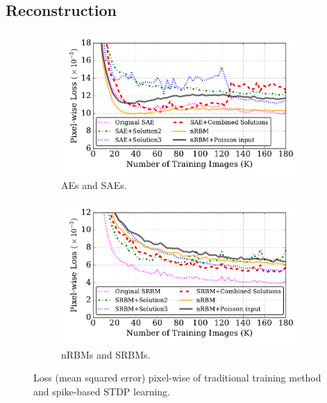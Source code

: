 \subsection{Reconstruction}

\begin{figure}
	\centering
	\begin{subfigure}[t]{0.49\textwidth}
		\includegraphics[width=\textwidth]{pics_sdlm/53_MNIST_SRBM_all/compare_recon.pdf}
		\caption{AEs and SAEs.}
	\end{subfigure}
	\begin{subfigure}[t]{0.49\textwidth}
		\includegraphics[width=\textwidth]{pics_sdlm/53_MNIST_SRBM_all/compare_recon_rbm.pdf}
		\caption{nRBMs and SRBMs.}
	\end{subfigure}
	\caption{Loss (mean squared error) pixel-wise of traditional training method and spike-based STDP learning.}
	\label{fig:sdlm_loss}
\end{figure}

